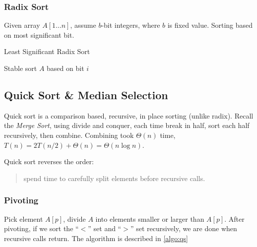 \subsubsection{Radix Sort}
Given array $A[1 \ldots n]$, assume $b$-bit integers, where $b$ is fixed value.
Sorting based on most significant bit.

\begin{algorithm}[H]
    \caption{Least Significant Radix Sort}\label{algo:lrs}
    \begin{algorithmic}[1]
                \State Stable sort $A$ based on bit $i$
            \EndFor
        \EndProcedure
    \end{algorithmic}
\end{algorithm}

\subsection{Quick Sort \& Median Selection}
Quick sort is a comparison based, recursive, in place sorting (unlike radix).
Recall the \emph{Merge Sort}, using divide and conquer,
each time break in half, sort each half recursively, then combine.
Combining took $\Theta(n)$ time, $T(n) = 2T(n/2) + \Theta(n) = \Theta(n \log n)$.

Quick sort reverses the order:
\begin{quote}
    spend time to carefully split elements before recursive calls.
\end{quote}

\subsubsection{Pivoting}
Pick element $A[p]$, divide $A$ into elements smaller or larger than $A[p]$.
After pivoting, if we sort the ``$<$'' set and ``$>$'' set recursively,
we are done when recursive calls return.
The algorithm is described in \cref{algo:qs}

